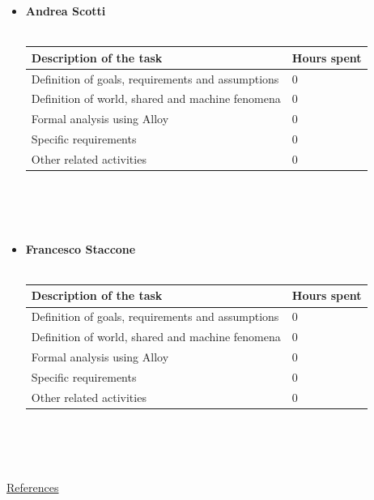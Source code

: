 \documentclass{article}
\begin{document}
\begin{legal}
{\begin{itemize}
		\item \textbf{Andrea Scotti}\\\\
				\begin{tabular}{| m{9cm} | m{3cm}| }
				\hline
					\textbf{Description of the task} & \textbf{Hours spent}\\
				\hline
					Definition of goals, requirements and assumptions & 0 \\
				\hline
					Definition of world, shared and machine fenomena & 0 \\
				\hline
					Formal analysis using Alloy & 0 \\
				\hline
					Specific requirements & 0 \\
				\hline
					Other related activities & 0 \\
				\hline
				\end{tabular}
				\\\\\\
		\item \textbf{Francesco Staccone}\\\\
				\begin{tabular}{| m{9cm} | m{3cm}| }
				\hline
					\textbf{Description of the task} & \textbf{Hours spent}\\
				\hline
					Definition of goals, requirements and assumptions & 0 \\
				\hline
					Definition of world, shared and machine fenomena & 0 \\
				\hline
					Formal analysis using Alloy & 0 \\
				\hline
					Specific requirements & 0 \\
				\hline
					Other related activities & 0 \\
				\hline
				\end{tabular}
				\\\\\\
		\end{itemize}
		}
	\item \underline{References}\\
	\end{legal}
\end{document}
